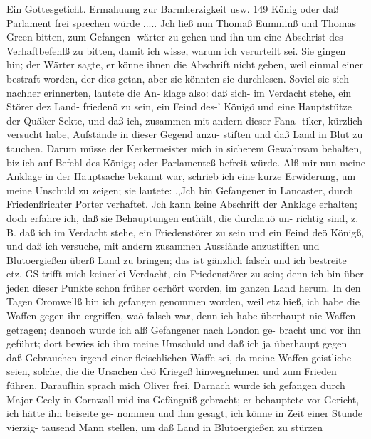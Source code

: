 Ein Gottesgeticht. Ermahuung zur Barmherzigkeit usw. 149
König oder daß Parlament frei sprechen würde ..... Jch ließ
nun Thomaß Eumminß und Thomas Green bitten, zum Gefangen-
wärter zu gehen und ihn um eine Abschrist des Verhaftbefehlß zu
bitten, damit ich wisse, warum ich verurteilt sei. Sie gingen hin;
der Wärter sagte, er könne ihnen die Abschrift nicht geben, weil
einmal einer bestraft worden, der dies getan, aber sie könnten sie
durchlesen. Soviel sie sich nachher erinnerten, lautete die An-
klage also: daß sich- im Verdacht stehe, ein Störer dez Land-
friedenö zu sein, ein Feind des-’ Königö und eine Hauptstütze der
Quäker-Sekte, und daß ich, zusammen mit andern dieser Fana-
tiker, kürzlich versucht habe, Aufstände in dieser Gegend anzu-
stiften und daß Land in Blut zu tauchen. Darum müsse der
Kerkermeister mich in sicherem Gewahrsam behalten, biz ich auf
Befehl des Königs; oder Parlamenteß befreit würde.
Alß mir nun meine Anklage in der Hauptsache bekannt war,
schrieb ich eine kurze Erwiderung, um meine Unschuld zu zeigen;
sie lautete:
,,Jch bin Gefangener in Lancaster, durch Friedenßrichter
Porter verhaftet. Jch kann keine Abschrift der Anklage erhalten;
doch erfahre ich, daß sie Behauptungen enthält, die durchauö un-
richtig sind, z. B. daß ich im Verdacht stehe, ein Friedenstörer
zu sein und ein Feind deö Königß, und daß ich versuche, mit
andern zusammen Aussiände anzustiften und Blutoergießen überß
Land zu bringen; das ist gänzlich falsch und ich bestreite etz. GS
trifft mich keinerlei Verdacht, ein Friedenstörer zu sein; denn
ich bin über jeden dieser Punkte schon früher oerhört worden, im
ganzen Land herum. In den Tagen Cromwellß bin ich gefangen
genommen worden, weil etz hieß, ich habe die Waffen gegen ihn
ergriffen, waö falsch war, denn ich habe überhaupt nie Waffen
getragen; dennoch wurde ich alß Gefangener nach London ge-
bracht und vor ihn geführt; dort bewies ich ihm meine Umschuld
und daß ich ja überhaupt gegen daß Gebrauchen irgend einer
fleischlichen Waffe sei, da meine Waffen geistliche seien, solche,
die die Ursachen deö Kriegeß hinwegnehmen und zum Frieden
führen. Daraufhin sprach mich Oliver frei. Darnach wurde ich
gefangen durch Major Ceely in Cornwall mid ins Gefängniß
gebracht; er behauptete vor Gericht, ich hätte ihn beiseite ge-
nommen und ihm gesagt, ich könne in Zeit einer Stunde vierzig-
tausend Mann stellen, um daß Land in Blutoergießen zu stürzen

